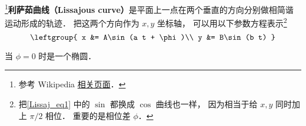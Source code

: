 
\begin{issues}
\issueDraft
\end{issues}

\footnote{参考 Wikipedia \href{https://en.wikipedia.org/wiki/Lissajous_curve}{相关页面}．}\textbf{利萨茹曲线（Lissajous curve）}是平面上一点在两个垂直的方向分别做相简谐运动形成的轨迹． 把这两个方向作为 $x, y$ 坐标轴， 可以用以下参数方程表示\footnote{把\autoref{Lissaj_eq1} 中的 $\sin$ 都换成 $\cos$ 曲线也一样， 因为相当于给 $x, y$ 同时加上 $\pi/2$ 相位． 重要的是相位差 $\phi$．}
\begin{equation}\label{Lissaj_eq1}
\leftgroup{
x &= A\sin(a t + \phi)\\
y &= B\sin(b t)
}\end{equation}

当 $\phi = 0$ 时是一个椭圆．

